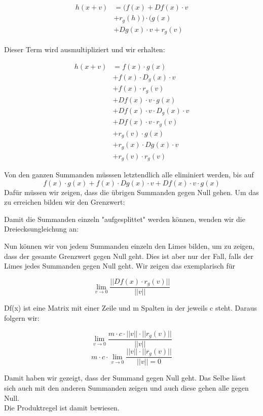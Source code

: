 \begin{align} \begin{split} h(x+v) & = (f(x) + Df(x) \cdot v \\ & + r_{g}(h)) \cdot (g(x) \\ & + Dg(x) \cdot v + r_{g}(v) \end{split} \end{align}

Dieser Term wird ausmultipliziert und wir erhalten: 

\begin{equation}
\begin{split} h(x+v) & = f(x) \cdot g(x) \\ & + f(x)  \cdot D_{g}(x) \cdot v \\ & + f(x) \cdot r_{g}(v) \\ & + Df(x) \cdot v \cdot g(x) \\ & +  Df(x) \cdot v \cdot D_{g}(x) \cdot v  \\ & + Df(x) \cdot v \cdot r_{g}(v) \\ & +  r_{g}(v) \cdot g(x) \\ & + r_{g}(x) \cdot Dg(x) \cdot v \\ & + r_{g}(v) \cdot r_{g}(v) \end{split} \end{equation}   %

Von den ganzen Summanden müsssen letztendlich alle eliminiert werden, bis auf 
\begin{equation} f(x) \cdot g(x) + f(x) \cdot Dg(x) \cdot v + Df(x) \cdot v \cdot g(x) \end{equation} 
Dafür müssen wir zeigen, dass die übrigen Summanden gegen Null gehen. Um das zu erreichen bilden wir den Grenzwert:

Damit die Summanden einzeln "aufgesplittet" werden können, wenden wir die Dreiecksungleichung %
an:

Nun können wir von jedem Summanden einzeln den Limes bilden, um zu zeigen, dass der gesamte Grenzwert gegen Null geht. Dies ist aber nur der Fall, falls der Limes jedes Summanden gegen Null geht. Wir zeigen das exemplarisch für 

\begin{equation} \lim\limits_{v \rightarrow 0} \frac{||Df(x) \cdot r_{g}(v)||}{||v||} \end{equation}

Df(x) ist eine Matrix mit einer Zeile und m Spalten in der jeweils c steht. Daraus folgern wir:

\begin{equation} \lim\limits_{v \rightarrow 0} \frac{m \cdot c \cdot ||v|| \cdot ||r_{g}(v)||}{||v||} \end{equation}
\begin{equation}m \cdot c \cdot \lim\limits_{v \rightarrow 0} \frac{ ||v|| \cdot ||r_{g}(v)||}{||v|| = 0} \end{equation} 

Damit haben wir gezeigt, dass der Summand gegen Null geht. Das Selbe lässt sich auch mit den anderen Summanden zeigen und auch diese gehen alle gegen Null. \\
Die Produktregel ist damit bewiesen.